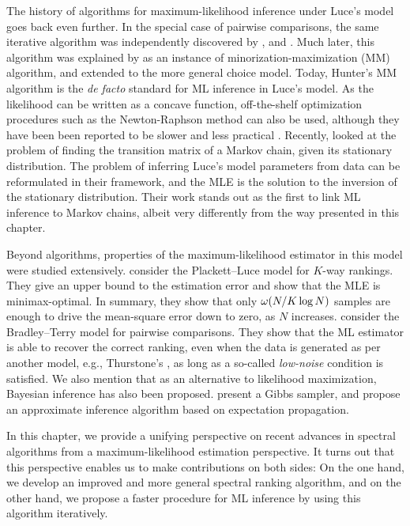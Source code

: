 The history of algorithms for maximum-likelihood inference under Luce's model goes back even further.
In the special case of pairwise comparisons, the same iterative algorithm was independently discovered by \citet{zermelo1928berechnung}, \citet{ford1957solution} and \citet{dykstra1960rank}.
Much later, this algorithm was explained by \citet{hunter2004mm} as an instance of minorization-maximization (MM) algorithm, and extended to the more general choice model.
Today, Hunter's MM algorithm is the \emph{de facto} standard for ML inference in Luce's model.
As the likelihood can be written as a concave function, off-the-shelf optimization procedures such as the Newton-Raphson method can also be used, although they have been been reported to be slower and less practical \citep{hunter2004mm}.
Recently, \citet{kumar2015inverting} looked at the problem of finding the transition matrix of a Markov chain, given its stationary distribution.
The problem of inferring Luce's model parameters from data can be reformulated in their framework, and the MLE is the solution to the inversion of the stationary distribution.
Their work stands out as the first to link ML inference to Markov chains, albeit very differently from the way presented in this chapter.

Beyond algorithms, properties of the maximum-likelihood estimator in this model were studied extensively.
\citet{hajek2014minimax} consider the Plackett--Luce model for $K$-way rankings.
They give an upper bound to the estimation error and show that the MLE is minimax-optimal.
In summary, they show that only $\omega(N/K \log N)$ samples are enough to drive the mean-square error down to zero, as $N$ increases.
\citet{rajkumar2014statistical} consider the Bradley--Terry model for pairwise comparisons.
They show that the ML estimator is able to recover the correct ranking, even when the data is generated as per another model, e.g., Thurstone's \citep{thurstone1927method}, as long as a so-called \emph{low-noise} condition is satisfied.
We also mention that as an alternative to likelihood maximization, Bayesian inference has also been proposed.
\citet{caron2012efficient} present a Gibbs sampler, and \citet{guiver2009bayesian} propose an approximate inference algorithm based on expectation propagation.

In this chapter, we provide a unifying perspective on recent advances in spectral algorithms \citep{negahban2012iterative, azari2013generalized} from a maximum-likelihood estimation perspective.
It turns out that this perspective enables us to make contributions on both sides:
On the one hand, we develop an improved and more general spectral ranking algorithm, and on the other hand, we propose a faster procedure for ML inference by using this algorithm iteratively.
